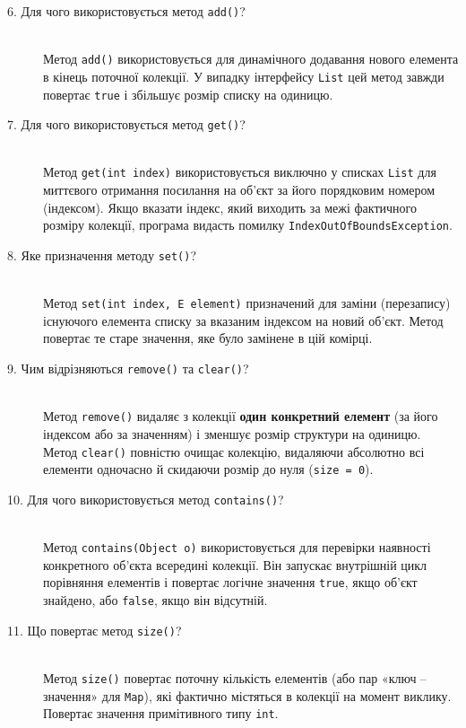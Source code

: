 \begin{description}
    \item[6. Для чого використовується метод \texttt{add()}?] ~\\
    Метод \texttt{add()} використовується для динамічного додавання нового елемента в кінець поточної колекції. У випадку інтерфейсу \texttt{List} цей метод завжди повертає \texttt{true} і збільшує розмір списку на одиницю.

    \item[7. Для чого використовується метод \texttt{get()}?] ~\\
    Метод \texttt{get(int index)} використовується виключно у списках \texttt{List} для миттєвого отримання посилання на об'єкт за його порядковим номером (індексом). Якщо вказати індекс, який виходить за межі фактичного розміру колекції, програма видасть помилку \texttt{IndexOutOfBoundsException}.

    \item[8. Яке призначення методу \texttt{set()}?] ~\\
    Метод \texttt{set(int index, E element)} призначений для заміни (перезапису) існуючого елемента списку за вказаним індексом на новий об'єкт. Метод повертає те старе значення, яке було замінене в цій комірці.

    \item[9. Чим відрізняються \texttt{remove()} та \texttt{clear()}?] ~\\
    Метод \texttt{remove()} видаляє з колекції \textbf{один конкретний елемент} (за його індексом або за значенням) і зменшує розмір структури на одиницю. Метод \texttt{clear()} повністю очищає колекцію, видаляючи абсолютно всі елементи одночасно й скидаючи розмір до нуля (\texttt{size = 0}).

    \item[10. Для чого використовується метод \texttt{contains()}?] ~\\
    Метод \texttt{contains(Object o)} використовується для перевірки наявності конкретного об'єкта всередині колекції. Він запускає внутрішній цикл порівняння елементів і повертає логічне значення \texttt{true}, якщо об'єкт знайдено, або \texttt{false}, якщо він відсутній.

    \item[11. Що повертає метод \texttt{size()}?] ~\\
    Метод \texttt{size()} повертає поточну кількість елементів (або пар «ключ -- значення» для \texttt{Map}), які фактично містяться в колекції на момент виклику. Повертає значення примітивного типу \texttt{int}.


\end{description}
